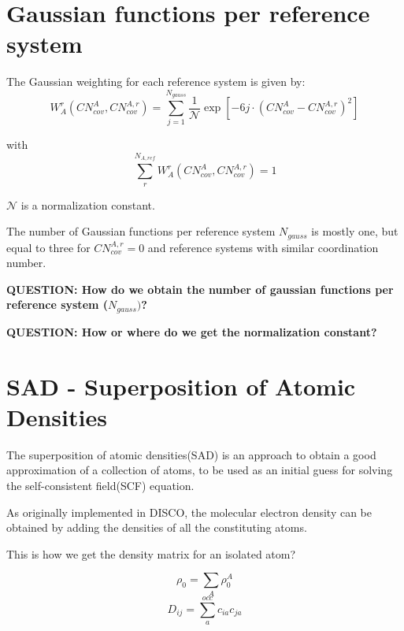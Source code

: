 \documentclass{article}
\newcommand{\q}[1]{\textbf{QUESTION: #1}}
\begin{document}
\section{Gaussian functions per reference system}
\noindent
The Gaussian weighting for each reference system is given by:
\begin{equation}
  W_A^r(CN_{cov}^A, CN_{cov}^{A,r}) = \sum_{j=1}^{N_{gauss}} \frac{1}{\mathcal{N}} \exp\left[-6j \cdot (CN_{cov}^A - CN_{cov}^{A,r})^2\right]
\end{equation}

\noindent
with
\begin{equation}
  \sum_{r}^{N_{A,ref}} W_A^r(CN_{cov}^A, CN_{cov}^{A,r}) = 1
\end{equation}

\vspace{10pt}
\noindent
\(\mathcal{N}\) is a normalization constant.

\noindent
The number of Gaussian functions per reference system \(N_{gauss}\) is mostly one, but equal to three for \(CN_{cov}^{A,r} = 0\) and reference systems with similar coordination number.

\q{How do we obtain the number of gaussian functions per reference system (\(N_{gauss})\)?}

\q{How or where do we get the normalization constant?}



\section{SAD - Superposition of Atomic Densities}

The superposition of atomic densities(SAD) is an approach to obtain a good approximation of a collection of atoms, to be used as an initial guess for solving the self-consistent field(SCF) equation.

As originally implemented in DISCO, the molecular electron density can be obtained by adding the densities of all the constituting atoms.



This is how we get the density matrix for an isolated atom?

\begin{equation}
  \rho_0 = \sum_A \rho_0^A
\end{equation}
\begin{equation}
  D_{ij} = \sum_a^{occ} c_{ia} c_{ja}
\end{equation}
\end{document}
